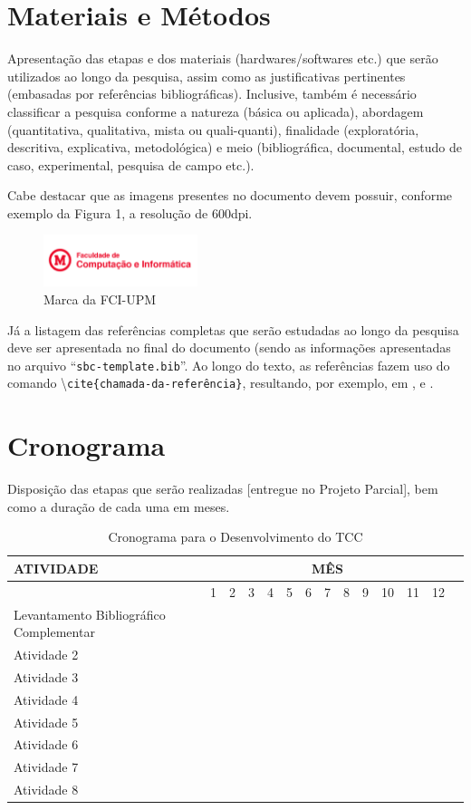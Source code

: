 \documentclass[12pt]{article}
\begin{document}
\section{Materiais e Métodos}
Apresentação das etapas e dos materiais (hardwares/softwares etc.) que serão utilizados ao longo da pesquisa, assim como as justificativas pertinentes (embasadas por referências bibliográficas). Inclusive, também é necessário classificar a pesquisa conforme a natureza (básica ou aplicada), abordagem (quantitativa, qualitativa, mista ou quali-quanti), finalidade (exploratória, descritiva, explicativa, metodológica) e meio (bibliográfica, documental, estudo de caso, experimental, pesquisa de campo etc.).

Cabe destacar que as imagens presentes no documento devem possuir, conforme exemplo da Figura 1, a resolução de 600dpi. 

\begin{figure}[h]
\centering
\includegraphics[width=0.4\textwidth]{fci.png}
\caption{Marca da FCI-UPM}
\end{figure}

Já a listagem das referências completas que serão estudadas ao longo da pesquisa deve ser apresentada no final do documento (sendo as informações apresentadas no arquivo ``\texttt{sbc-template.bib}''. Ao longo do texto, as referências fazem uso do comando  \textbackslash\texttt{cite\{chamada-da-referência\}}, resultando, por exemplo, em \cite{boulic:91}, \cite{smith:99} e \cite{knuth:84}.

\section{Cronograma}
Disposição das etapas que serão realizadas [entregue no Projeto Parcial], bem como a duração de cada uma em meses.

\begin{table}[!htp]\centering
\caption{Cronograma para o Desenvolvimento do TCC}\label{tab: }
\scriptsize
\begin{tabular}{lr|r|r|r|r|r|r|r|r|r|r|rr}\toprule
\multirow{2}{*}{\textbf{ATIVIDADE}} &\multicolumn{12}{c}{\textbf{MÊS}} \\\midrule
&1 &2 &3 &4 &5 &6 &7 &8 &9 &10 &11 &12 \\
Levantamento Bibliográfico Complementar & & & & & & & & & & & \\
Atividade 2 & & & & & & & & & & & \\
Atividade 3 & & & & & & & & & & & \\
Atividade 4 & & & & & & & & & & & \\
Atividade 5 & & & & & & & & & & & \\
Atividade 6 & & & & & & & & & & & \\
Atividade 7 & & & & & & & & & & & \\
Atividade 8 & & & & & & & & & & & \\
\bottomrule
\end{tabular}
\end{table}


\def\refname{Referências Bibliográficas}

\end{document}
